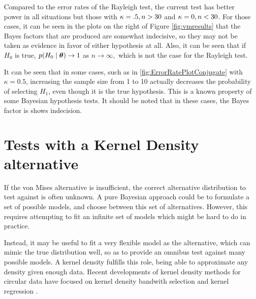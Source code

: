 Compared to the error rates of the Rayleigh test, the current test has better power in all situations but those with \( \kappa = .5, n > 30\) and \(\kappa = 0, n < 30\). For those cases, it can be seen in the plots on the right of Figure \ref{fig:vmresults} that the Bayes factors that are produced are somewhat indecisive, so they may not be taken as evidence in favor of either hypothesis at all. Also, it can be seen that if \( H_0 \) is true, \( p(H_0 \mid \boldsymbol{\theta} ) \rightarrow 1 \) as \( n \rightarrow \infty,\) which is not the case for the Rayleigh test.

It can be seen that in some cases, such as in \ref{fig:ErrorRatePlotConjugate} with \(\kappa = 0.5\), increasing the sample size from 1 to 10 actually decreases the probability of selecting \(H_1\), even though it is the true hypothesis. This is a known property of some Bayesian hypothesis tests. It should be noted that in these cases, the Bayes factor is shows indecision. 


\section{Tests with a Kernel Density alternative}
\label{sec:KDE}

If the von Mises alternative is insufficient, the correct alternative distribution to test against is often unknown. A pure Bayesian approach could be to formulate a set of possible models, and choose between this set of alternatives. However, this requires attempting to fit an infinite set of models which might be hard to do in practice.

Instead, it may be useful to fit a very flexible model as the alternative, which can mimic the true distribution well, so as to provide an omnibus test against many possible models. A kernel density fulfills this role, being able to approximate any density given enough data. Recent developments of kernel density methods for circular data have focused on kernel density bandwith selection and kernel regression  \citep{di2009local,  oliveira2012plug, di2013non, JSSv061i09}.

